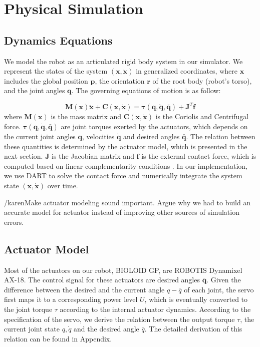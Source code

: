 \section{Physical Simulation}

\subsection{Dynamics Equations}

We model the robot as an articulated rigid body system in our simulator. We represent the states of the system $(\mathbf{x}, \dot{\mathbf{x}})$ in generalized coordinates, where $\mathbf{x}$ includes the global position $\mathbf{p}$, the orientation $\mathbf{r}$ of the root body (robot's torso), and the joint angles $\mathbf{q}$. The governing equations of motion is as follow:

\begin{equation}
\label{eq:robotdynamics}
\mathbf{M}(\mathbf{x})\mathbf{\ddot{x}}+\mathbf{C}(\mathbf{x},\mathbf{\dot{x}})=\mathbf{\tau}(\mathbf{q}, \dot{\mathbf{q}}, \bar{\mathbf{q}})+\mathbf{J}^T\mathbf{f}
\end{equation}
where $\mathbf{M}(\mathbf{x})$ is the mass matrix and $\mathbf{C}(\mathbf{x},\mathbf{\dot{x}})$ is the Coriolis and Centrifugal force. $\mathbf{\tau}(\mathbf{q}, \dot{\mathbf{q}}, \bar{\mathbf{q}})$ are joint torques exerted by the actuators, which depends on the current joint angles $\mathbf{q}$, velocities $\dot{\mathbf{q}}$ and desired angles $\bar{\mathbf{q}}$. The relation between these quantities is determined by the actuator model, which is presented in the next section. $\mathbf{J}$ is the Jacobian matrix and $\mathbf{f}$ is the external contact force, which is computed based on linear complementarity conditions \cite{Tan:2012b}. In our implementation, we use DART to solve the contact force and numerically integrate the system state $(\mathbf{x}, \dot{\mathbf{x}})$ over time.

/karen{Make actuator modeling sound important. Argue why we had to build an accurate model for actuator instead of improving other sources of simulation errors.}

\subsection{Actuator Model}
\label{sec:motorDynamics}
Most of the actuators on our robot, BIOLOID GP, are ROBOTIS Dynamixel AX-18. The control signal for these actuators are desired angles $\bar{\mathbf{q}}$. Given the difference between the desired and the current angle ${q-\bar{q}}$ of each joint, the servo first maps it to a corresponding power level $U$, which is eventually converted to the joint torque $\tau$ according to the internal actuator dynamics. According to the specification of the servo, we derive the relation between the output torque $\tau$, the current joint state $q, \dot{q}$ and the desired angle $\bar{q}$. The detailed derivation of this relation can be found in Appendix.

